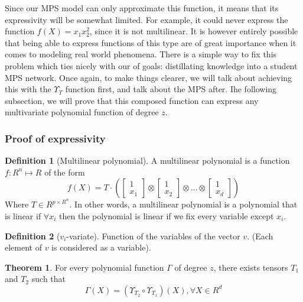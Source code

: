 \documentclass{article}
\theoremstyle{definition}
\newtheorem{definition}{Definition}[section]
\newtheorem{theorem}{Theorem}[section]
\theoremstyle{definition}
\begin{document}
Since our MPS model can only approximate this function, it means that its expressivity
will be somewhat limited. For example, it could never express the function $f(X) = x_1x_2^2$, since it is not multilinear. It is however entirely possible that being able to express functions of this type are of great importance when it comes to modeling real world phenomena. There is a simple way to fix this problem which ties nicely with our of goals: distillating knowledge into a student MPS network. Once again, to make things clearer, we will talk about achieving this with the $\Upsilon_{T}$ function first, and talk about the MPS after. Ihe following subsection, we will prove that this composed function can express
any multivariate polynomial function of degree $z$.

\subsubsection{Proof of expressivity}
\begin{definition}[Multilinear polynomial]
    A multilinear polynomial is a function $f: R^n \mapsto R$ of the form
    \begin{equation}
        f(X) = T \cdot \left( 
            \begin{bmatrix} 1 \\ x_1 \end{bmatrix} \otimes 
            \begin{bmatrix} 1 \\ x_2 \end{bmatrix} \otimes 
            \dots \otimes 
            \begin{bmatrix} 1 \\ x_d \end{bmatrix}
        \right)
    \end{equation}
    Where $T \in R^{p \times R^n }$. In other words, a multilinear polynomial is a polynomial that is linear if  $\forall x_i$ then the polynomial is linear if we fix every variable except $x_i$.
\end{definition}

\begin{definition}[$v_i$-variate]
Function of the variables of the vector $v$. (Each element of $v$ is considered as a variable).
\end{definition}


\begin{theorem}
    For every polynomial function $\Gamma$ of degree $z$, there exists tensors $T_1$ and $T_2$ such that
    \[ \Gamma(X) = \left(\Upsilon_{T_2} \circ \Upsilon_{T_1}\right) (X), \forall X \in R^d\]
\end{theorem}
\end{document}
